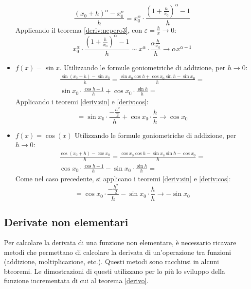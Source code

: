 \begin{itemize}
	      \[
		      \frac{(x_0+h)^\alpha-x_0^\alpha}{h}=x_0^\alpha\cdot \frac{(1+\frac{h}{x_0})^\alpha-1}{h}
	      \]
	      Applicando il teorema \ref{deriv:nepero3}, con $\varepsilon=\frac{h}{x}\to0$:
	      \[
		      x_0^\alpha\cdot \frac{(1+\frac{h}{x_0})^\alpha-1}{h}\sim x^\alpha\cdot \frac{\alpha\frac{h}{x_0}}{h}\to\alpha x^{\alpha-1}
	      \]
	\item $f(x)=\sin x$. Utilizzando le formule goniometriche di addizione, per $h\to0$:
	      \begin{gather*}
		      \frac{\sin(x_0+h)-\sin x_0}{h}=\frac{\sin x_0\cos h+\cos x_0\sin h-\sin x_0}{h}=\\
		      \sin x_0 \cdot \frac{\cos h -1}{h}+\cos x_0 \cdot \frac{\sin h}{h}=
	      \end{gather*}
	      Applicando i teoremi \ref{deriv:sin} e \ref{deriv:cos}:
	      \[
		      =\sin x_0 \cdot \frac{-\frac{h^2}{2}}{h}+\cos x_0 \cdot \frac{h}{h}\to \cos x_0
	      \]
	\item $f(x)=\cos(x)$ Utilizzando le formule goniometriche di addizione, per $h\to0$:
	      \begin{gather*}
		      \frac{\cos(x_0+h)-\cos x_0}{h}=\frac{\cos x_0\cos h-\sin x_0\sin h-\cos x_0}{h}=\\
		      \cos x_0 \cdot \frac{\cos h -1}{h}-\sin x_0 \cdot \frac{\sin h}{h}=
	      \end{gather*}
	      Come nel caso precedente, si applicano i teoremi \ref{deriv:sin} e \ref{deriv:cos}:
	      \[
		      =\cos x_0 \cdot \frac{-\frac{h^2}{2}}{h}-\sin x_0 \cdot \frac{h}{h}\to-\sin x_0
	      \]
\end{itemize}


\subsection{Derivate non elementari}
Per calcolare la derivata di una funzione non elementare, è necessario ricavare metodi che permettano di calcolare la derivata di un'operazione tra funzioni (addizione, moltiplicazione, etc.). Questi metodi sono racchiusi in alcuni bteoremi. Le dimostrazioni di questi utilizzano per lo più lo sviluppo della funzione incrementata di cui al teorema \vref{derivo}.

